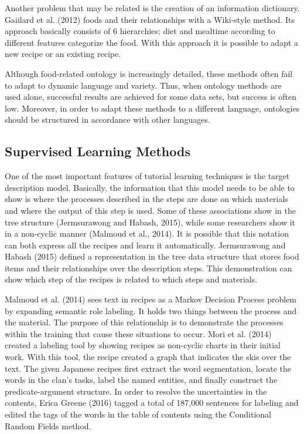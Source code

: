 Another problem that may be related is the creation of an information dictionary. Gaiilard et al. (2012) foods and their relationships with a Wiki-style method. Its approach basically consists of 6 hierarchies; diet and mealtime according to different features categorize the food. With this approach it is possible to adapt a new recipe or an existing recipe.

Although food-related ontology is increasingly detailed, these methods often fail to adapt to dynamic language and variety. Thus, when ontology methods are used alone, successful results are achieved for some data sets, but success is often low. Moreover, in order to adapt these methods to a different language, ontologies should be structured in accordance with other languages.


\subsection{Supervised Learning Methods}
One of the most important features of tutorial learning techniques is the target description model. Basically, the information that this model needs to be able to show is where the processes described in the steps are done on which materials and where the output of this step is used. Some of these associations show in the tree structure (Jermsurawong and Habash, 2015), while some researchers show it in a non-cyclic manner (Malmoud et al., 2014). It is possible that this notation can both express all the recipes and learn it automatically.
Jermsurawong and Habash (2015) defined a representation in the tree data structure that stores food items and their relationships over the description steps. This demonstration can show which step of the recipes is related to which steps and materials.

Malmoud et al. (2014) sees text in recipes as a Markov Decision Process problem by expanding semantic role labeling. It holds two things between the process and the material. The purpose of this relationship is to demonstrate the processes within the training that cause these situations to occur.
Mori et al. (2014) created a labeling tool by showing recipes as non-cyclic charts in their initial work. With this tool, the recipe created a graph that indicates the skis over the text. The given Japanese recipes first extract the word segmentation, locate the words in the clan's tasks, label the named entities, and finally construct the predicate-argument structure.
In order to resolve the uncertainties in the contents, Erica Greene (2016) tagged a total of 187,000 sentences for labeling and edited the tags of the words in the table of contents using the Conditional Random Fields method.


